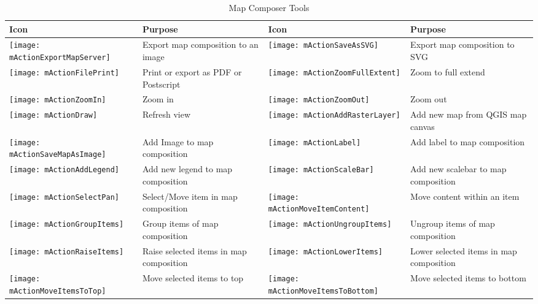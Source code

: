 \begin{table}[h]
\centering
\caption{Map Composer Tools}\label{tab:mapcomposer_tools}\medskip
 \begin{tabular}{|l|p{6.9cm}|l|p{6.9cm}|}
 \hline \textbf{Icon} & \textbf{Purpose} & \textbf{Icon} &
 \textbf{Purpose} \\

 \hline \texttt{[image: mActionExportMapServer]}
 & Export map composition to an image & 
 \texttt{[image: mActionSaveAsSVG]} & Export map composition 
 to SVG \\
 \hline \texttt{[image: mActionFilePrint]} & Print or 
 export as PDF or Postscript &
 \texttt{[image: mActionZoomFullExtent]} & Zoom to
 full extend \\
 \hline \texttt{[image: mActionZoomIn]} & Zoom in &
 \texttt{[image: mActionZoomOut]} & Zoom out \\
 \hline \texttt{[image: mActionDraw]} & Refresh 
 view &
 \texttt{[image: mActionAddRasterLayer]} & Add 
 new map from QGIS map canvas \\
 \hline \texttt{[image: mActionSaveMapAsImage]} & Add Image to 
 map composition &
 \texttt{[image: mActionLabel]} & Add label to map composition \\
 \hline \texttt{[image: mActionAddLegend]} & Add new legend to 
 map composition & 
 \texttt{[image: mActionScaleBar]} & Add new scalebar to map
 composition\\
 \hline \texttt{[image: mActionSelectPan]} & Select/Move item in 
 map composition &
 \texttt{[image: mActionMoveItemContent]} & Move content within
 an item \\
 \hline \texttt{[image: mActionGroupItems]} & Group items of 
 map composition & 
 \texttt{[image: mActionUngroupItems]} & Ungroup items of map 
 composition \\
 \hline \texttt{[image: mActionRaiseItems]} & Raise selected
 items in map composition &
 \texttt{[image: mActionLowerItems]} & Lower selected items 
 in map composition \\
 \hline \texttt{[image: mActionMoveItemsToTop]} & Move selected
 items to top & 
 \texttt{[image: mActionMoveItemsToBottom]} & Move selected
 items to bottom \\
\hline
\end{tabular}
\end{table}

